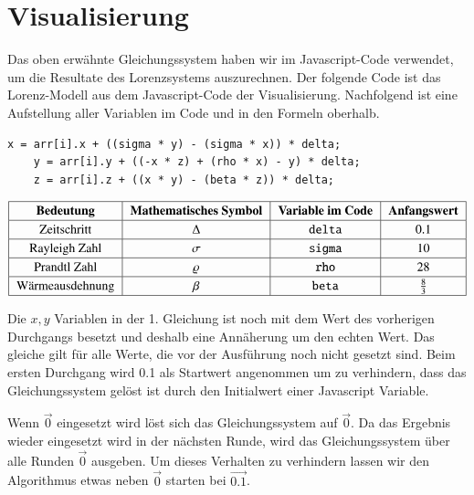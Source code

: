 
\section{Visualisierung}
Das oben erwähnte Gleichungssystem haben wir im Javascript-Code verwendet, um die Resultate des Lorenzsystems auszurechnen. Der folgende Code ist das Lorenz-Modell aus dem Javascript-Code der Visualisierung. Nachfolgend ist eine Aufstellung aller Variablen im Code und in den Formeln oberhalb.

	\begin{lstlisting}[style=C]
	x = arr[i].x + ((sigma * y) - (sigma * x)) * delta;
	y = arr[i].y + ((-x * z) + (rho * x) - y) * delta;
	z = arr[i].z + ((x * y) - (beta * z)) * delta;
	\end{lstlisting}

\begin{align*}
{\renewcommand{\arraystretch}{1.2}
	\begin{tabular}{| c | c | c | c |}
		\hline
		\textbf{Bedeutung} & \textbf{Mathematisches Symbol} & \textbf{Variable im Code} & \textbf{Anfangswert}\\\hline
		Zeitschritt & $ \Delta $ & \texttt{delta} & 0.1 \\\hline
		Rayleigh Zahl & $ \sigma $ & \texttt{sigma} & 10 \\\hline
		Prandtl Zahl & $\varrho $ & \texttt{rho} & 28 \\\hline
		Wärmeausdehnung & $\beta $ & \texttt{beta}  & $ \frac{8}{3} $ \\\hline
	\end{tabular}
}
\end{align*}

Die $ x, y $ Variablen in der 1. Gleichung ist noch mit dem Wert des vorherigen Durchgangs besetzt und deshalb eine Annäherung um den echten Wert. Das gleiche gilt für alle Werte, die vor der Ausführung noch nicht gesetzt sind. 
Beim ersten Durchgang wird 0.1 als Startwert angenommen um zu verhindern, dass das Gleichungssystem gelöst ist durch den Initialwert einer Javascript Variable. 

Wenn $ \vec{0} $ eingesetzt wird löst sich das Gleichungssystem auf $ \vec{0} $. Da das Ergebnis wieder eingesetzt wird in der nächsten Runde, wird das Gleichungssystem über alle Runden $ \vec{0} $ ausgeben. Um dieses Verhalten zu verhindern lassen wir den Algorithmus etwas neben $ \vec{0} $ starten bei $ \vec{0.1} $.

